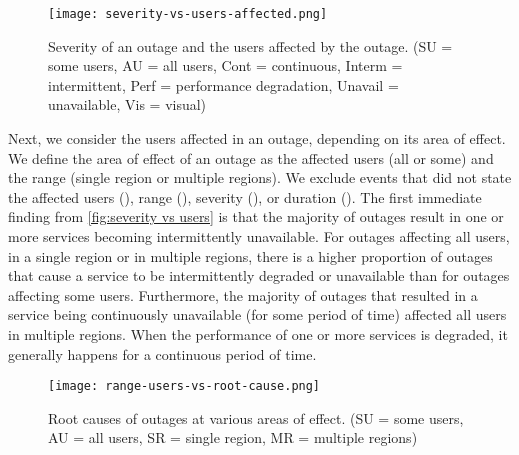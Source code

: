 \begin{figure}[h]
  \centering
  \texttt{[image: severity-vs-users-affected.png]}
  \caption{Severity of an outage and the users affected by the outage. (SU = some users, AU = all users, Cont = continuous, Interm = intermittent, Perf = performance degradation, Unavail = unavailable, Vis = visual)}
  \label{fig:severity vs users}
\end{figure}

Next, we consider the users affected in an outage, depending on its area of effect.
We define the area of effect of an outage as the affected users (all or some) and the range (single region or multiple regions).
We exclude events that did not state the affected users (), range (), severity (), or duration ().
The first immediate finding from \autoref{fig:severity vs users} is that the majority of outages result in one or more services becoming intermittently unavailable.
For outages affecting all users, in a single region or in multiple regions, there is a higher proportion of outages that cause a service to be intermittently degraded or unavailable than for outages affecting some users.
Furthermore, the majority of outages that resulted in a service being continuously unavailable (for some period of time) affected all users in multiple regions.
When the performance of one or more services is degraded, it generally happens for a continuous period of time.

\begin{figure}[h]
  \centering
  \texttt{[image: range-users-vs-root-cause.png]}
  \caption{Root causes of outages at various areas of effect. (SU = some users, AU = all users, SR = single region, MR = multiple regions)}
  \label{fig:causes vs aoes}
\end{figure}

